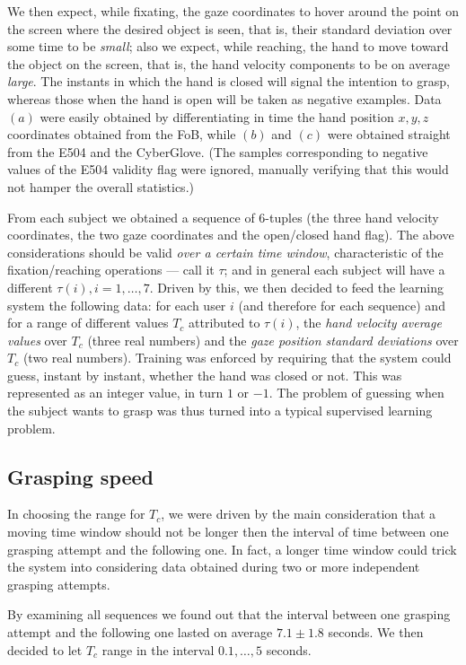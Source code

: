 \documentclass[jou,a4paper,notxfonts]{apa}
\begin{document}
We then expect, while fixating, the gaze coordinates to hover around
the point on the screen where the desired object is seen, that is,
their standard deviation over some time to be \emph{small}; also we
expect, while reaching, the hand to move toward the object on the
screen, that is, the hand velocity components to be on average
\emph{large}. The instants in which the hand is closed will signal the
intention to grasp, whereas those when the hand is open will be taken
as negative examples. Data $(a)$ were easily obtained by
differentiating in time the hand position $x,y,z$ coordinates obtained
from the FoB, while $(b)$ and $(c)$ were obtained straight from the
E504 and the CyberGlove. (The samples corresponding to negative values
of the E504 validity flag were ignored, manually verifying that this
would not hamper the overall statistics.)

From each subject we obtained a sequence of $6$-tuples (the three hand
velocity coordinates, the two gaze coordinates and the open/closed
hand flag). The above considerations should be valid \emph{over a
certain time window}, characteristic of the fixation/reaching
operations --- call it $\tau$; and in general each subject will have a
different $\tau(i), i=1,\ldots,7$. Driven by this, we then decided to
feed the learning system the following data: for each user $i$ (and
therefore for each sequence) and for a range of different values $T_c$
attributed to $\tau(i)$, the \emph{hand velocity average values} over
$T_c$ (three real numbers) and the \emph{gaze position standard
deviations} over $T_c$ (two real numbers). Training was enforced by
requiring that the system could guess, instant by instant, whether the
hand was closed or not. This was represented as an integer value, in
turn $1$ or $-1$. The problem of guessing when the subject wants to
grasp was thus turned into a typical supervised learning problem.

\subsection{Grasping speed}

In choosing the range for $T_c$, we were driven by the main
consideration that a moving time window should not be longer then the
interval of time between one grasping attempt and the following
one. In fact, a longer time window could trick the system into
considering data obtained during two or more independent grasping
attempts.

By examining all sequences we found out that the interval between one
grasping attempt and the following one lasted on average $7.1 \pm 1.8$
seconds. We then decided to let $T_c$ range in the interval
$0.1,\ldots,5$ seconds.
\end{document}
